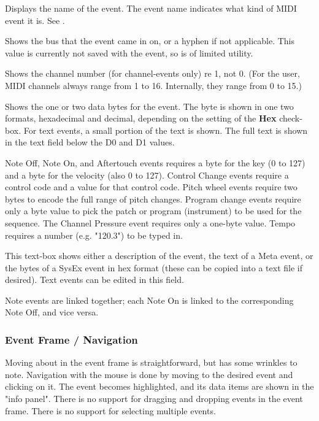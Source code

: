    Displays the name of the event.
   The event name indicates what kind of MIDI event it is. 
   See .

   Shows the bus that the event came in on, or a hyphen if not applicable.
   This value is currently not saved with the event,
   so is of limited utility.

   Shows the channel number (for channel-events only) re 1, not 0.
   (For the user, MIDI channels always range from
   1 to 16.  Internally, they range from 0 to 15.)

   Shows the one or two data bytes for the event.
   The byte is shown in one two formats, hexadecimal and decimal, depending
   on the setting of the \textbf{Hex} check-box.
   For text events, a small portion of the text is shown.
   The full text is shown in the text field below the D0 and D1 values.

   Note Off, Note On, and Aftertouch events requires a byte for the key (0 to
   127) and a byte for the velocity (also 0 to 127).
   Control Change events require a control code and a value for that control
   code.  Pitch wheel events require two bytes to encode the full range of
   pitch changes.
   Program change events require only a byte value to pick the patch or program
   (instrument) to be used for the sequence.  The Channel Pressure event
   requires only a one-byte value.
   Tempo requires a number (e.g. "120.3") to be typed in.

   This text-box shows either a description of the event, the text of
   a Meta event, or the bytes of a SysEx event in hex format (these can be
   copied into a text file if desired).
   Text events can be edited in this field.

   Note events are linked together; each Note On is linked to the corresponding
   Note Off, and vice versa.

\subsubsection{Event Frame / Navigation}
\label{subsec:event_frame_navigation}

   Moving about in the event frame is straightforward, but has some
   wrinkles to note.
   Navigation with the mouse is done by moving to the desired event and
   clicking on it.  The event becomes highlighted, and its data items are shown
   in the "info panel".
   There is no support for dragging and dropping events in the event frame.
   There is no support for selecting multiple events.


